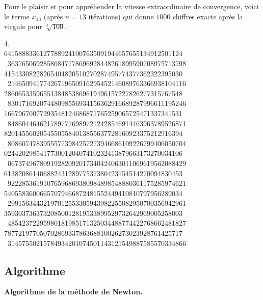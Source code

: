 \documentclass[11pt,class=report,crop=false]{standalone}
\begin{document}
\begin{exemple}
Pour le plaisir et pour appréhender la vitesse extraordinaire de convergence, voici le terme $x_{13}$ (après $n=13$ itérations) qui donne $1000$ chiffres exacts après la virgule pour $\sqrt[3]{100}$.
\begin{center}
{\footnotesize
4. \hphantom{64158883361277889241007635091944657655134912501124x}  \\
64158883361277889241007635091944657655134912501124 \ 
36376506928586847778696928448261899590708975713798 \\
41543308228265404820510270287495774377362322395030 \ 
21465094177426719650916295452146089763366938104116 \\
28606533596551384853869619496157227826277315767548 \ 
83017169207448098556934156362916689287996611195246 \\
16679670077293548124686871765259065725471337341531 \ 
84860446462178977769897212428546914463963789526871 \\
82014556020545505584013855637728160923375212916394 \ 
80860747839555773984257273946686109226799406050704 \\
02442029854177300120407410232413879663173270034106 \ 
06737496780919282092017340424063011069619562088429 \\
61382086140688243128977537380423154514270094830453 \ 
92228536191076596869380984898548880361175285974621 \\
54055836006657079466872481552449410810797956289034 \ 
29915634432197012553305943982255082950700356942961 \\
35930373637320850012819533899529732642969005258003 \ 
48542372295980181985171325034488774422768662481827 \\
78772197705070286933786368810026273023928761425717 \ 
31457550215784934201074501143121549887585570334866\  \\
  }
\end{center}

\end{exemple}


\subsection{Algorithme}

\textbf{Algorithme de la méthode de Newton.}
\end{document}
